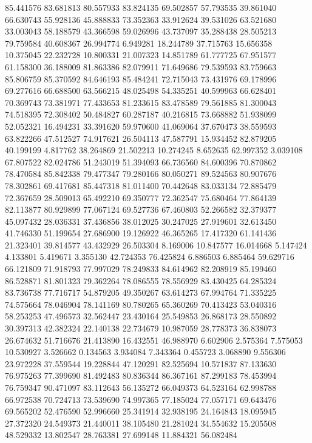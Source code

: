 85.441576
83.681813
80.557933
83.824135
69.502857
57.793535
39.861040
66.630743
55.928136
45.888833
73.352363
33.912624
39.531026
63.521680
33.003043
58.188579
43.366598
59.026996
43.737097
35.288438
28.505213
79.759584
40.608367
26.994774
6.949281
18.244789
37.715763
15.656358
10.375045
22.232728
10.800331
21.007323
14.851789
61.777725
67.951577
61.158300
36.188009
81.863386
82.079911
71.649686
79.539593
83.759663
85.806759
85.370592
84.646193
85.484241
72.715043
73.431976
69.178996
69.277616
66.688500
63.566215
48.025498
54.335251
40.599963
66.628401
70.369743
73.381971
77.433653
81.233615
83.478589
79.561885
81.300043
74.518395
72.308402
50.484827
60.287187
40.216815
73.668882
51.938099
52.052321
16.494231
33.391620
59.970600
41.069064
37.670473
38.559593
63.822266
47.512527
74.917621
26.504113
47.587791
15.934452
82.879205
40.199199
4.817762
38.264869
21.502213
10.274245
8.652635
62.997352
3.039108
67.807522
82.024786
51.243019
51.394093
66.736560
84.600396
70.870862
78.470584
85.842338
79.477347
79.280166
80.050271
89.524563
80.907676
78.302861
69.417681
85.447318
81.011400
70.442648
83.033134
72.885479
72.367659
28.509013
65.492210
69.350777
72.362547
75.680464
77.864139
82.113877
80.929899
77.067124
69.527736
67.460803
52.266582
32.379377
45.097432
28.036331
37.436856
38.012025
30.247025
27.919601
32.613450
41.746330
51.199654
27.686900
19.126922
46.365265
17.417320
61.141436
21.323401
39.814577
43.432929
26.503304
8.169006
10.847577
16.014668
5.147424
4.133801
5.419671
3.355130
42.724353
76.425824
6.886503
6.885464
59.629716
66.121809
71.918793
77.997029
78.249833
84.614962
82.208919
85.199460
86.528871
81.801323
79.362264
78.086555
78.556929
83.430425
64.285324
83.736738
77.716717
54.879205
49.350267
63.614273
67.994764
71.335225
74.575664
78.046904
78.141169
80.780265
65.360269
70.413423
53.040316
58.253253
47.496573
32.562447
23.430164
25.549853
26.868173
28.550892
30.397313
42.382324
22.140138
22.734679
10.987059
28.778373
36.838073
26.674632
51.716676
21.413890
16.432551
46.988970
6.602906
2.575364
7.575053
10.530927
3.526662
0.134563
3.934084
7.343364
0.455723
3.068890
9.556306
23.972228
37.559544
19.228844
47.120291
82.525694
10.571837
87.133630
76.975263
77.399690
81.492483
80.836344
86.367161
87.299183
78.453994
76.759347
90.471097
83.112643
56.135272
66.049373
64.523164
62.998788
66.972538
70.724713
73.539690
74.997365
77.185024
77.057171
69.643476
69.565202
52.476590
52.996660
25.341914
32.938195
24.164843
18.095945
27.372320
24.549373
21.440011
38.105480
21.281024
34.554632
15.205508
48.529332
13.802547
28.763381
27.699148
11.884321
56.082484
